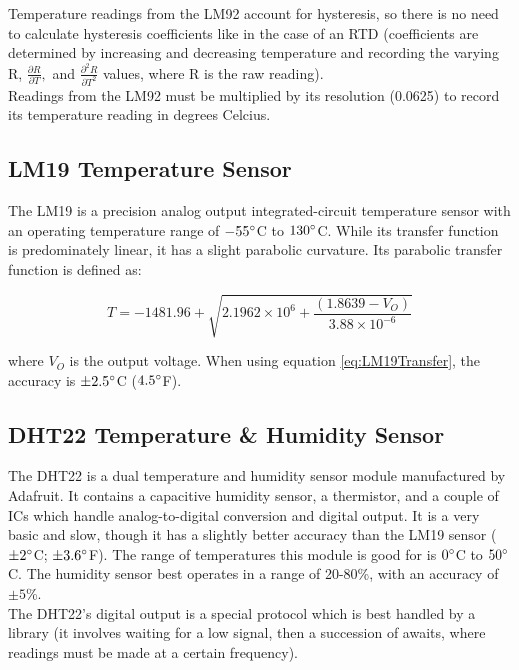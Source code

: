 \documentclass{article}
\begin{document}
\noindent Temperature readings from the LM92 account for hysteresis, so there is no need to calculate hysteresis coefficients like in the case of an RTD (coefficients are determined by increasing and decreasing temperature and recording the varying R, \(\frac{\partial R}{\partial T},\) and \(\frac{\partial^2 R}{\partial T^2}\) values, where R is the raw reading).\\

\noindent Readings from the LM92 must be multiplied by its resolution (0.0625) to record its temperature reading in degrees Celcius.\\


\subsection{LM19 Temperature Sensor}
\label{sec:LM19}

The LM19 is a precision analog output integrated-circuit temperature sensor with an operating temperature range of \(-55 \degree\)C to \(130 \degree\)C. While its transfer function is predominately linear, it has a slight parabolic curvature. Its parabolic transfer function is defined as:

\[
	T = -1481.96 + \sqrt{2.1962 \times 10^6 + \frac{\left(1.8639 - V_O\right)}{3.88 \times 10^{-6}}} \tag{1}
\label{eq:LM19Transfer}
\]

\noindent where \(V_O\) is the output voltage. When using equation \ref{eq:LM19Transfer}, the accuracy is \(\pm 2.5 \degree\)C (\(4.5 \degree\)F).


\subsection{DHT22 Temperature \& Humidity Sensor}
\label{sec:DHT22}

The DHT22 is a dual temperature and humidity sensor module manufactured by Adafruit. It contains a capacitive humidity sensor, a thermistor, and a couple of ICs which handle analog-to-digital conversion and digital output. It is a very basic and slow, though it has a slightly better accuracy than the LM19 sensor (\(\pm 2 \degree\)C; \(\pm 3.6 \degree\)F). The range of temperatures this module is good for is \(0 \degree\)C to \(50 \degree\)C. The humidity sensor best operates in a range of 20-80\%, with an accuracy of \(\pm 5\)\%.\\

\noindent The DHT22's digital output is a special protocol which is best handled by a library (it involves waiting for a low signal, then a succession of awaits, where readings must be made at a certain frequency).\\
\end{document}
